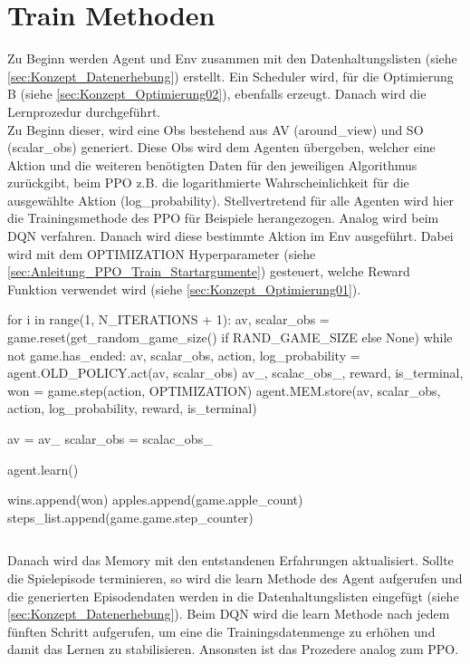 \section{Train Methoden} \label{sec:Implementierung_train_Methode}
Zu Beginn werden Agent und Env zusammen mit den Datenhaltungslisten (siehe \ref{sec:Konzept_Datenerhebung}) erstellt. Ein Scheduler wird, für die Optimierung B (siehe \ref{sec:Konzept_Optimierung02}), ebenfalls erzeugt.
Danach wird die Lernprozedur durchgeführt.\\
Zu Beginn dieser, wird eine Obs bestehend aus AV (around\_view) und SO (scalar\_obs) generiert. Diese Obs wird dem Agenten übergeben, welcher eine Aktion und die weiteren benötigten Daten für den jeweiligen Algorithmus zurückgibt, beim PPO z.B. die logarithmierte Wahrscheinlichkeit für die ausgewählte Aktion (log\_probability).
Stellvertretend für alle Agenten wird hier die Trainingsmethode des PPO für Beispiele herangezogen. Analog wird beim DQN verfahren.
Danach wird diese bestimmte Aktion im Env ausgeführt. Dabei wird mit dem OPTIMIZATION Hyperparameter (siehe \ref{sec:Anleitung_PPO_Train_Startargumente}) gesteuert, welche Reward Funktion verwendet wird 
(siehe \ref{sec:Konzept_Optimierung01}).
\begin{python}
for i in range(1, N_ITERATIONS + 1):
	av, scalar_obs = game.reset(get_random_game_size() if RAND_GAME_SIZE else None)
	while not game.has_ended:
		av, scalar_obs, action, log_probability = agent.OLD_POLICY.act(av, scalar_obs)	
		av_, scalac_obs_, reward, is_terminal, won = game.step(action, OPTIMIZATION)
		agent.MEM.store(av, scalar_obs, action, log_probability, reward, is_terminal)
		
		av = av_
		scalar_obs = scalac_obs_
		
	agent.learn()
		
	wins.append(won)
	apples.append(game.apple_count)
	steps_list.append(game.game.step_counter)
\end{python}
\begin{lstlisting}[caption=Spielablauf \& Datenspeicherung, label=code:Bestimmung_Spielablauf_Datenspeicherung]
\end{lstlisting}
Danach wird das Memory mit den entstandenen Erfahrungen aktualisiert.
Sollte die Spielepisode terminieren, so wird die learn Methode des Agent aufgerufen und die generierten Episodendaten werden in die Datenhaltungslisten eingefügt (siehe \ref{sec:Konzept_Datenerhebung}). Beim DQN wird die learn Methode nach jedem fünften Schritt aufgerufen, um eine die Trainingsdatenmenge zu erhöhen und damit das Lernen zu stabilisieren. Ansonsten ist das Prozedere analog zum PPO.\\

